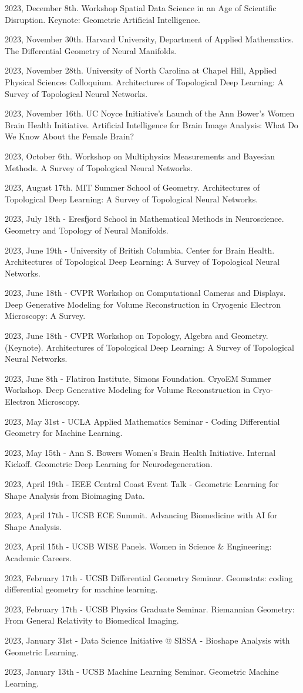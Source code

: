 2023, December 8th. Workshop Spatial Data Science in an Age of Scientific Disruption. Keynote: Geometric Artificial Intelligence.

2023, November 30th. Harvard University, Department of Applied Mathematics. The Differential Geometry of Neural Manifolds.

2023, November 28th. University of North Carolina at Chapel Hill, Applied Physical Sciences Colloquium. Architectures of Topological Deep Learning: A Survey of Topological Neural Networks.

2023, November 16th. UC Noyce Initiative's Launch of the Ann Bower's Women Brain Health Initiative. Artificial Intelligence for Brain Image Analysis: What Do We Know About the Female Brain? 

2023, October 6th. Workshop on Multiphysics Measurements and Bayesian Methods. A Survey of Topological Neural Networks. 

2023, August 17th. MIT Summer School of Geometry. Architectures of Topological Deep Learning: A Survey of Topological Neural Networks.

2023, July 18th - Eresfjord School in Mathematical Methods in Neuroscience. Geometry and Topology of Neural Manifolds.

2023, June 19th - University of British Columbia. Center for Brain Health. Architectures of Topological Deep Learning: A Survey of Topological Neural Networks.

2023, June 18th - CVPR Workshop on Computational Cameras and Displays. Deep Generative Modeling for Volume Reconstruction in Cryogenic Electron Microscopy: A Survey.

2023, June 18th - CVPR Workshop on Topology, Algebra and Geometry. (Keynote). Architectures of Topological Deep Learning: A Survey of Topological Neural Networks.

2023, June 8th - Flatiron Institute, Simons Foundation. CryoEM Summer Workshop. Deep Generative Modeling for Volume Reconstruction in Cryo-Electron Microscopy.

2023, May 31st - UCLA Applied Mathematics Seminar - Coding Differential Geometry for Machine Learning.

2023, May 15th - Ann S. Bowers Women’s Brain Health Initiative. Internal Kickoff. Geometric Deep Learning for Neurodegeneration.

2023, April 19th - IEEE Central Coast Event Talk - Geometric Learning for Shape Analysis from Bioimaging Data.

2023, April 17th - UCSB ECE Summit. Advancing Biomedicine with AI for Shape Analysis.

2023, April 15th - UCSB WISE Panels. Women in Science \& Engineering: Academic Careers.

2023, February 17th - UCSB Differential Geometry Seminar. Geomstats: coding differential geometry for machine learning.

2023, February 17th - UCSB Physics Graduate Seminar. Riemannian Geometry: From General Relativity to Biomedical Imaging.

2023, January 31st - Data Science Initiative @ SISSA - Bioshape Analysis with Geometric Learning.

2023, January 13th - UCSB Machine Learning Seminar. Geometric Machine Learning.